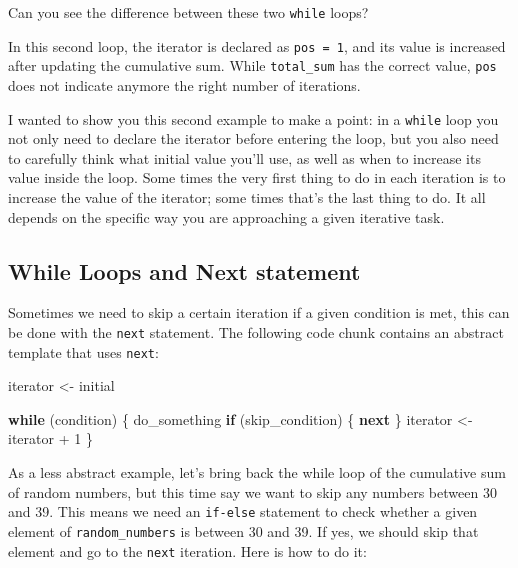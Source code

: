 \documentclass[
]{book}
\newenvironment{Shaded}{\begin{snugshade}}{\end{snugshade}}
\newcommand{\ControlFlowTok}[1]{\textcolor[rgb]{0.13,0.29,0.53}{\textbf{#1}}}
\newcommand{\DecValTok}[1]{\textcolor[rgb]{0.00,0.00,0.81}{#1}}
\newcommand{\NormalTok}[1]{#1}
\newcommand{\OtherTok}[1]{\textcolor[rgb]{0.56,0.35,0.01}{#1}}
\newcommand{\SpecialCharTok}[1]{\textcolor[rgb]{0.00,0.00,0.00}{#1}}
\begin{document}
Can you see the difference between these two \texttt{while} loops?

In this second loop, the iterator is declared as \texttt{pos\ =\ 1}, and its value is
increased after updating the cumulative sum. While \texttt{total\_sum} has the correct
value, \texttt{pos} does not indicate anymore the right number of iterations.

I wanted to show you this second example to make a point: in a \texttt{while} loop
you not only need to declare the iterator before entering the loop, but you
also need to carefully think what initial value you'll use, as well as when
to increase its value inside the loop. Some times the very first thing to do
in each iteration is to increase the value of the iterator; some times that's
the last thing to do. It all depends on the specific way you are approaching
a given iterative task.

\hypertarget{while-loops-and-next-statement}{%
\subsection{While Loops and Next statement}\label{while-loops-and-next-statement}}

Sometimes we need to skip a certain iteration if a given condition is met, this
can be done with the \texttt{next} statement. The following code chunk contains an
abstract template that uses \texttt{next}:

\begin{Shaded}
\begin{Highlighting}[]
\NormalTok{iterator }\OtherTok{\textless{}{-}}\NormalTok{ initial}

\ControlFlowTok{while}\NormalTok{ (condition) \{}
\NormalTok{  do\_something}
  \ControlFlowTok{if}\NormalTok{ (skip\_condition) \{}
    \ControlFlowTok{next}
\NormalTok{  \}}
\NormalTok{  iterator }\OtherTok{\textless{}{-}}\NormalTok{ iterator }\SpecialCharTok{+} \DecValTok{1}
\NormalTok{\}}
\end{Highlighting}
\end{Shaded}

As a less abstract example, let's bring back the while loop of the cumulative
sum of random numbers, but this time say we want to skip any numbers between
30 and 39. This means we need an \texttt{if-else} statement to check whether a
given element of \texttt{random\_numbers} is between 30 and 39. If yes, we should
skip that element and go to the \texttt{next} iteration. Here is how to do it:
\end{document}
